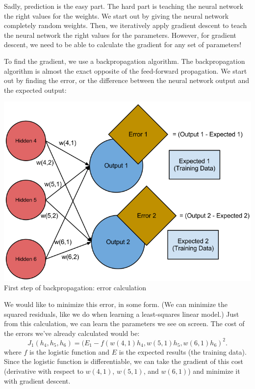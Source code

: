 \documentclass{article}
\begin{document}
Sadly, prediction is the easy part. The hard part is teaching the neural network the right values
for the weights. We start out by giving the neural network completely random weights. Then, we
iteratively apply gradient descent to teach the neural network the right values for the parameters.
However, for gradient descent, we need to be able to calculate the gradient for any set of
parameters!

To find the gradient, we use a backpropagation algorithm. The backpropagation algorithm is almost
the exact opposite of the feed-forward propagation. We start out by finding the error, or the
difference between the neural network output and the expected output:

\begin{center}
    \includegraphics[scale=0.5]{images/backprop-1.png}\\
    First step of backpropagation: error calculation
\end{center}

We would like to minimize this error, in some form. (We can minimize the squared residuals, like we
do when learning a least-squares linear model.) Just from this calculation, we can learn the
parameters we see on screen. The cost of the errors we've already calculated would be: 
\[J_1(h_4, h_5, h_6) = (E_1 - f(w(4,1)h_4, w(5,1)h_5, w(6,1)h_6)^2.\]
where $f$ is the logistic function and $E$ is the expected results (the training data). Since the
logistic function is differentiable, we can take the gradient of this cost (derivative with respect
to $w(4,1)$, $w(5,1)$, and $w(6,1)$) and minimize it with gradient descent.
\end{document}
